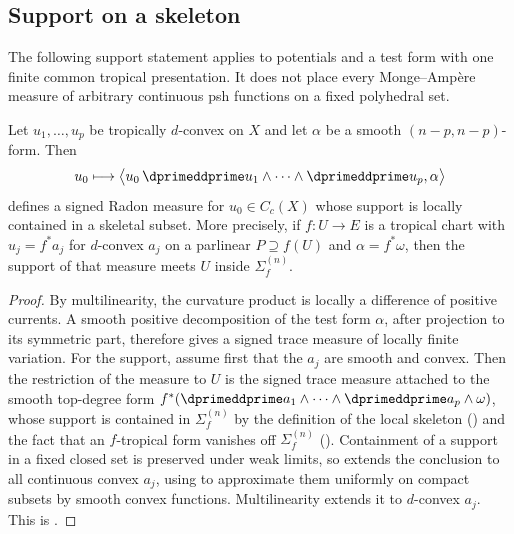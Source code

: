 \subsection{Support on a skeleton}
\label{sec:ch16-support-skeleton}

The following support statement applies to potentials and a test form
with one finite common tropical presentation.  It does not place every
Monge--Amp\`ere measure of arbitrary continuous psh functions on a fixed
polyhedral set.

\begin{proposition}
\label{prop:ch16-skeletal-support}
Let $u_1,\ldots,u_p$ be tropically $d$-convex on $X$ and let $\alpha$ be a
smooth $(n-p,n-p)$-form.  Then
\[
 u_0\longmapsto
 \bigl\langle
   u_0\,\dprimeddprime u_1\wedge\cdots\wedge\dprimeddprime u_p,\alpha
 \bigr\rangle
\]
defines a signed Radon measure for $u_0\in C_c(X)$ whose support is locally contained in a
skeletal subset.  More precisely, if $f:U\to E$ is a tropical chart with
$u_j=f^*a_j$ for $d$-convex $a_j$ on a parlinear $P\supseteq f(U)$ and
$\alpha=f^*\omega$, then the support of that measure meets $U$ inside
$\Sigma_f^{(n)}$.
\end{proposition}

\begin{proof}
By multilinearity, the curvature product is locally a difference of
positive currents.  A smooth positive decomposition of the test form
$\alpha$, after projection to its symmetric part, therefore gives a signed
trace measure of locally finite variation.  For the support,
assume first that the $a_j$ are smooth and convex.  Then the restriction of
the measure to $U$ is the signed trace measure attached to the smooth top-degree form
$f^*(\dprimeddprime a_1\wedge\cdots\wedge\dprimeddprime a_p\wedge\omega)$,
whose support is contained in $\Sigma_f^{(n)}$ by the definition of the
local skeleton () and the fact that an
$f$-tropical form vanishes off $\Sigma_f^{(n)}$
().  Containment of a support in a
fixed closed set is preserved under weak limits, so
 extends the conclusion to all continuous convex
$a_j$, using  to approximate
them uniformly on compact subsets by smooth convex functions.
Multilinearity extends it to $d$-convex $a_j$.  This is
\cite[Remark~8.8.6]{CLD25}.
\end{proof}

